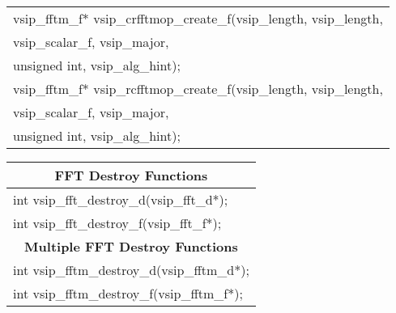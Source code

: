 {\begin{tabular}[H]{|l|}
vsip\_fftm\_f* vsip\_crfftmop\_create\_f(vsip\_length, vsip\_length,\\*\hspace{.7cm}vsip\_scalar\_f, vsip\_major,\\*\hspace{.7cm} unsigned int, vsip\_alg\_hint);\\
vsip\_fftm\_f* vsip\_rcfftmop\_create\_f(vsip\_length, vsip\_length,\\*\hspace{.7cm}vsip\_scalar\_f, vsip\_major,\\*\hspace{.7cm} unsigned int, vsip\_alg\_hint);\\ \hline
\end{tabular}
}
\clearpage
\hspace*{1.cm} {
\ttfamily
\begin{tabular}[H]{|l|}
\multicolumn{1}{c}{\rmfamily \bfseries FFT Destroy Functions}\\ \hline
int vsip\_fft\_destroy\_d(vsip\_fft\_d*);\\
int vsip\_fft\_destroy\_f(vsip\_fft\_f*);\\ \hline
\multicolumn{1}{c}{\rmfamily \bfseries Multiple FFT Destroy Functions}\\ \hline
int vsip\_fftm\_destroy\_d(vsip\_fftm\_d*);\\
int vsip\_fftm\_destroy\_f(vsip\_fftm\_f*);\\ \hline
\end{tabular}
}\vspace{.1cm}
